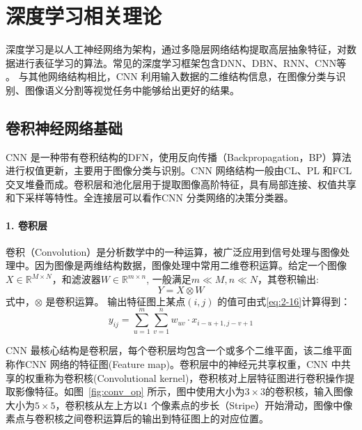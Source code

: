 
\chapter{深度学习相关理论}
\label{cha:chap02}
深度学习是以人工神经网络为架构，通过多隐层网络结构提取高层抽象特征，对数据进行表征学习的算法。常见的深度学习框架包含DNN、DBN、RNN、CNN等\cite{krizhevsky2012imagenet} 。 与其他网络结构相比，CNN 利用输入数据的二维结构信息，在图像分类与识别、图像语义分割等视觉任务中能够给出更好的结果。

\section{卷积神经网络基础}
\label{sec:chap02-1}

CNN 是一种带有卷积结构的DFN，使用反向传播（Backpropagation，BP）算法进行权值更新，主要用于图像分类与识别。CNN 网络结构一般由CL、PL 和FCL 交叉堆叠而成。卷积层和池化层用于提取图像高阶特征，具有局部连接、权值共享和下采样等特性。全连接层可以看作CNN 分类网络的决策分类器。

\subsubsection*{1. 卷积层}
\label{subsec:chap02-2-1-1}
卷积（Convolution）是分析数学中的一种运算，被广泛应用到信号处理与图像处理中。因为图像是两维结构数据，图像处理中常用二维卷积运算。给定一个图像$X \in \mathbb{R}^{M \times N}$，和滤波器$W \in \mathbb{R}^{m \times n}$, 一般满足$m \ll M, n \ll N$，其卷积输出:
\begin{equation}
  \label{eq:2-15}
  Y = X \otimes W
\end{equation}
式中，$\otimes$ 是卷积运算。 输出特征图上某点$(i,j)$ 的值可由式\ref{eq:2-16}计算得到：
\begin{equation}
  \label{eq:2-16}
  y_{ij} = \sum_{u=1}^m\sum_{v=1}^n w_{uv}\cdot x_{i-u+1,j-v+1}
\end{equation}

CNN 最核心结构是卷积层，每个卷积层均包含一个或多个二维平面，该二维平面称作CNN 网络的特征图(Feature map)。卷积层中的神经元共享权重，CNN 中共享的权重称为卷积核(Convolutional kernel)，卷积核对上层特征图进行卷积操作提取影像特征。如图~\ref{fig:conv_op} 所示，图中使用大小为$3\times3$的卷积核，输入图像大小为$5\times5$，卷积核从左上方以$1$ 个像素点的步长（Stripe）开始滑动，图像中像素点与卷积核之间卷积运算后的输出到特征图上的对应位置。

